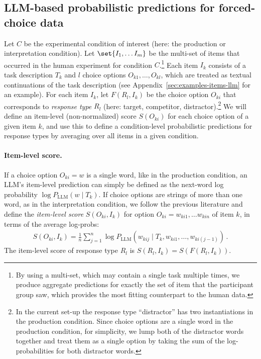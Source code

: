 \documentclass[fleqn]{article}
\begin{document}
\subsection{LLM-based probabilistic predictions for forced-choice data}
\label{sec:notat--term}

Let $C$ be the experimental condition of interest (here: the production or interpretation condition).
Let \(\set{I_1, \dots I_m}\) be the multi-set of items that occurred in the human experiment for condition $C$.\footnote{
  By using a multi-set, which may contain a single task multiple times, we produce aggregate predictions for exactly the set of item that the participant group saw, which provides the most fitting counterpart to the human data.
}
Each item $I_{k}$ consists of a task description $T_{k}$ and $l$ choice options $O_{k1}, \dots, O_{kl}$, which are treated as textual continuations of the task description (see Appendix~\ref{sec:examples-items-llm} for an example).
For each item $I_{k}$, let $F(R_{l}, I_{k})$ be the choice option $O_{ki}$ that corresponds to \emph{response type} $R_{l}$ (here: target, competitor, distractor).\footnote{In the current set-up the response type ``distractor'' has two instantiations in the production condition. Since choice options are a single word in the production condition, for simplicity, we lump both of the distractor words together and treat them as a single option by taking the sum of the log-probabilities for both distractor words.}
We will define an item-level (non-normalized) score $S(O_{ki})$ for each choice option of a given item $k$, and use this to define a condition-level probabilistic predictions for response types by averaging over all items in a given condition.

\paragraph{Item-level score.}
If a choice option $O_{ki} = w$ is a single word, like in the production condition, an LLM's item-level prediction can simply be defined as the next-word log probability $\log P_{\text{LLM}} (w \mid T_{k})$.
If choice options are strings of more than one word, as in the interpretation condition, we follow the previous literature \citep[e.g.,][]{BrownMann2020:Language-Models} and define the \emph{item-level score} $S(O_{{ki}}, I_{k})$ for option $O_{ki} = w_{ki1}, \dots w_{kin}$ of item $k$, in terms of the average log-probs:
%
\begin{align*}
S(O_{ki}, I_{k}) =  \frac{1}{n} \sum_{j=1}^n \log P_{\text{LLM}} \left(w_{kij} \mid T_{k}, w_{ki1}, \dots, w_{ki(j-1)} \right)  \,.
\end{align*}
%
The item-level score of response type $R_{l}$ is $S(R_{l}, I_{k}) = S(F(R_{l}, I_{k}))$.
\end{document}
